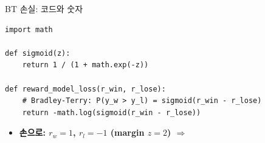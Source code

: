 \begin{frame}[fragile]{BT 손실: 코드와 숫자}
\begin{lstlisting}
import math

def sigmoid(z):
    return 1 / (1 + math.exp(-z))

def reward_model_loss(r_win, r_lose):
    # Bradley-Terry: P(y_w > y_l) = sigmoid(r_win - r_lose)
    return -math.log(sigmoid(r_win - r_lose))
\end{lstlisting}
  \small
  \begin{itemize}
    \item \textbf{손으로: $r_w = 1$, $r_l = -1$ (margin $z = 2$) $\Rightarrow$}
    
    
    
  \end{itemize}

\end{frame}

